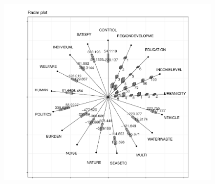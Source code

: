 \documentclass[article]{jss}
\begin{document}
\begin{appendix}
\begin{figure}[t!]
\centering
\includegraphics[width=1\textwidth]{pic/demo_book_radar} 
\caption{\label{fig:demo_book_radar}}
\end{figure}

\end{appendix}
\end{document}
